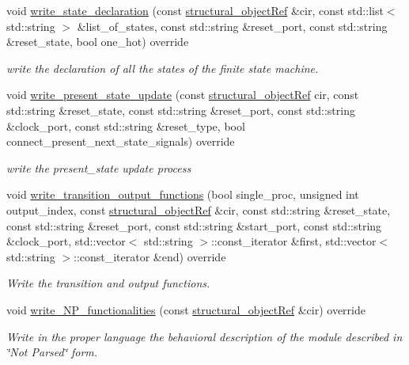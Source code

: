 \begin{DoxyCompactItemize}
void \hyperlink{classverilog__writer_a97913d24c2a3524e21363688c90f3eb0}{write\+\_\+state\+\_\+declaration} (const \hyperlink{structural__objects_8hpp_a8ea5f8cc50ab8f4c31e2751074ff60b2}{structural\+\_\+object\+Ref} \&cir, const std\+::list$<$ std\+::string $>$ \&list\+\_\+of\+\_\+states, const std\+::string \&reset\+\_\+port, const std\+::string \&reset\+\_\+state, bool one\+\_\+hot) override
\begin{DoxyCompactList}\small\item\em write the declaration of all the states of the finite state machine. \end{DoxyCompactList}\item 
void \hyperlink{classverilog__writer_ab1e052e8bfd33f42202ec7c834c80039}{write\+\_\+present\+\_\+state\+\_\+update} (const \hyperlink{structural__objects_8hpp_a8ea5f8cc50ab8f4c31e2751074ff60b2}{structural\+\_\+object\+Ref} cir, const std\+::string \&reset\+\_\+state, const std\+::string \&reset\+\_\+port, const std\+::string \&clock\+\_\+port, const std\+::string \&reset\+\_\+type, bool connect\+\_\+present\+\_\+next\+\_\+state\+\_\+signals) override
\begin{DoxyCompactList}\small\item\em write the present\+\_\+state update process \end{DoxyCompactList}\item 
void \hyperlink{classverilog__writer_a2c853b73efc5ca8215061d1055168718}{write\+\_\+transition\+\_\+output\+\_\+functions} (bool single\+\_\+proc, unsigned int output\+\_\+index, const \hyperlink{structural__objects_8hpp_a8ea5f8cc50ab8f4c31e2751074ff60b2}{structural\+\_\+object\+Ref} \&cir, const std\+::string \&reset\+\_\+state, const std\+::string \&reset\+\_\+port, const std\+::string \&start\+\_\+port, const std\+::string \&clock\+\_\+port, std\+::vector$<$ std\+::string $>$\+::const\+\_\+iterator \&first, std\+::vector$<$ std\+::string $>$\+::const\+\_\+iterator \&end) override
\begin{DoxyCompactList}\small\item\em Write the transition and output functions. \end{DoxyCompactList}\item 
void \hyperlink{classverilog__writer_ab4539a1601893c0c86f57bb66da56e45}{write\+\_\+\+N\+P\+\_\+functionalities} (const \hyperlink{structural__objects_8hpp_a8ea5f8cc50ab8f4c31e2751074ff60b2}{structural\+\_\+object\+Ref} \&cir) override
\begin{DoxyCompactList}\small\item\em Write in the proper language the behavioral description of the module described in \char`\"{}\+Not Parsed\char`\"{} form. \end{DoxyCompactList}\item 

\end{DoxyCompactItemize}
